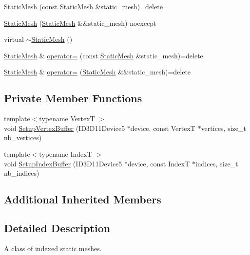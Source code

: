 \begin{DoxyCompactItemize}
\item 
\hyperlink{classmage_1_1_static_mesh_a15be69ad312c252c9816a57ec1555d73}{Static\+Mesh} (const \hyperlink{classmage_1_1_static_mesh}{Static\+Mesh} \&static\+\_\+mesh)=delete
\item 
\hyperlink{classmage_1_1_static_mesh_a8d2238338c9bc450e2aaaf79ada0634e}{Static\+Mesh} (\hyperlink{classmage_1_1_static_mesh}{Static\+Mesh} \&\&static\+\_\+mesh) noexcept
\item 
virtual \hyperlink{classmage_1_1_static_mesh_a7fbae949f631d29913193a1b2c2ef658}{$\sim$\+Static\+Mesh} ()
\item 
\hyperlink{classmage_1_1_static_mesh}{Static\+Mesh} \& \hyperlink{classmage_1_1_static_mesh_af73dd102f2de9cf7529e380895cfc8ff}{operator=} (const \hyperlink{classmage_1_1_static_mesh}{Static\+Mesh} \&static\+\_\+mesh)=delete
\item 
\hyperlink{classmage_1_1_static_mesh}{Static\+Mesh} \& \hyperlink{classmage_1_1_static_mesh_a38912f8555053abba649bea160d56e46}{operator=} (\hyperlink{classmage_1_1_static_mesh}{Static\+Mesh} \&\&static\+\_\+mesh)=delete
\end{DoxyCompactItemize}
\subsection*{Private Member Functions}
\begin{DoxyCompactItemize}
\item 
{\footnotesize template$<$typename VertexT $>$ }\\void \hyperlink{classmage_1_1_static_mesh_a51e5fd6cc526b8ecdfd7b06a33f50807}{Setup\+Vertex\+Buffer} (I\+D3\+D11\+Device5 $\ast$device, const VertexT $\ast$vertices, size\+\_\+t nb\+\_\+vertices)
\item 
{\footnotesize template$<$typename IndexT $>$ }\\void \hyperlink{classmage_1_1_static_mesh_ad9dbf64b48543424f008e664b7467360}{Setup\+Index\+Buffer} (I\+D3\+D11\+Device5 $\ast$device, const IndexT $\ast$indices, size\+\_\+t nb\+\_\+indices)
\end{DoxyCompactItemize}
\subsection*{Additional Inherited Members}


\subsection{Detailed Description}
A class of indexed static meshes. 

